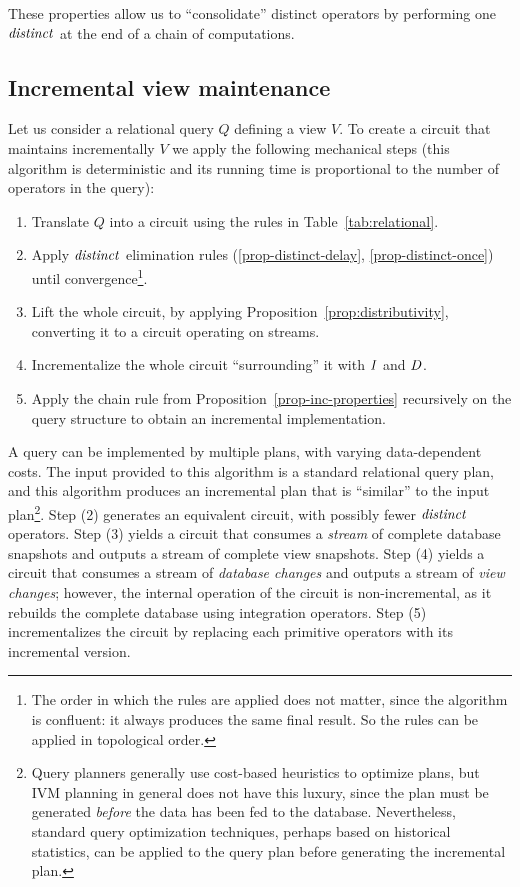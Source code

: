 These properties allow us to ``consolidate'' distinct operators by performing
one $\mathit{distinct}$ at the end of a chain of computations.

\subsection{Incremental view maintenance}

Let us consider a relational query $Q$
defining a view $V$.  To create a circuit that maintains incrementally $V$
we apply the following mechanical steps (this algorithm is deterministic
and its running time is proportional to the number of operators in the query):

\begin{algorithm}\label{algorithm-inc}\quad
\begin{enumerate}[nosep, leftmargin=\parindent]
    \item Translate $Q$ into a circuit using the rules in Table~\ref{tab:relational}.
    \item Apply $\mathit{distinct}$ elimination rules (\ref{prop-distinct-delay}, \ref{prop-distinct-once}) until convergence\footnote{The
    order in which the rules are applied does not matter, since the algorithm is
    confluent: it always produces the same final result. So the rules can be applied in topological order.}.
    \item Lift the whole circuit, by applying Proposition~\ref{prop:distributivity},
    converting it to a circuit operating on streams.
    \item Incrementalize the whole circuit ``surrounding'' it with $\mathit{I}$ and $\mathit{D}$.
    \item Apply the chain rule
    from Proposition~\ref{prop-inc-properties} recursively on the query structure
    to obtain an incremental implementation.
\end{enumerate}
\end{algorithm}

A query can be implemented by multiple plans, with varying data-dependent costs.  The input provided
to this algorithm is a standard relational query plan, and this algorithm produces
an incremental plan that is ``similar'' to the input plan\footnote{Query planners generally use cost-based
heuristics to optimize plans, but IVM planning in general does not have this luxury, since the plan
must be generated \emph{before} the data has been fed to the database.  Nevertheless, standard query
optimization techniques, perhaps based on historical statistics, can be applied to the query plan before
generating the incremental plan.}.  Step (2) generates an equivalent circuit, with possibly
fewer $\mathit{distinct}$ operators.
Step (3) yields a circuit that consumes a \emph{stream} of complete database snapshots and outputs a
stream of complete view snapshots. Step (4) yields a circuit that consumes a stream of \emph{database changes}
and outputs a stream of \emph{view changes}; however, the internal operation of the
circuit is non-incremental, as it rebuilds the complete database using
integration operators.  Step (5) incrementalizes the circuit by replacing each
primitive operators with its incremental version.

